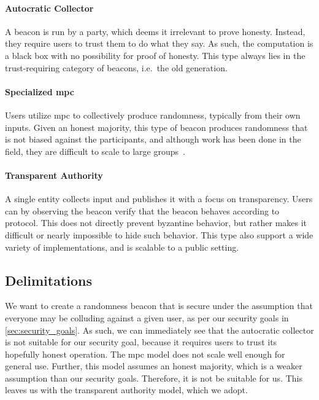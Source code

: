 \paragraph{Autocratic Collector} A beacon is run by a party, which deems it irrelevant to prove honesty. Instead, they require users to trust them to do what they say. As such, the computation is a black box with no possibility for proof of honesty. This type always lies in the trust-requiring category of beacons, i.e.\ the old generation.

\paragraph{Specialized \acrshort{mpc}} Users utilize \acrfull{mpc} to collectively produce randomness, typically from their own inputs. Given an honest majority, this type of beacon produces randomness that is not biased against the participants, and although work has been done in the field, they are difficult to scale to large groups~\cite{cascudo2017scrape, syta2017scalable}.

\paragraph{Transparent Authority} A single entity collects input and publishes it with a focus on transparency. Users can by observing the beacon verify that the beacon behaves according to protocol. This does not directly prevent byzantine behavior, but rather makes it difficult or nearly impossible to hide such behavior. This type also support a wide variety of implementations, and is scalable to a public setting.

\subsection{Delimitations}%
\label{sub:delimitations}
We want to create a randomness beacon that is secure under the assumption that everyone may be colluding against a given user, as per our security goals in \cref{sec:security_goals}. As such, we can immediately see that the autocratic collector is not suitable for our security goal, because it requires users to trust its hopefully honest operation. The \gls{mpc} model does not scale well enough for general use. Further, this model assumes an honest majority, which is a weaker assumption than our security goals. Therefore, it is not be suitable for us. This leaves us with the transparent authority model, which we adopt.

